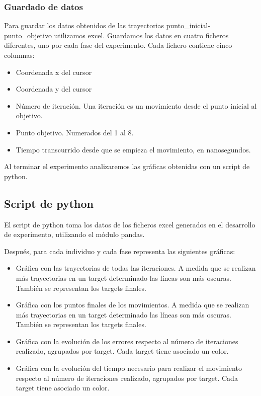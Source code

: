\documentclass[a4paper,11pt, oneside]{book}
\begin{document}
\subsubsection{Guardado de datos}

Para guardar los datos obtenidos de las trayectorias punto\_inicial-punto\_objetivo utilizamos excel. Guardamos los datos en cuatro ficheros diferentes, uno por cada fase del experimento. Cada fichero contiene cinco columnas:
\begin{itemize}
	\item Coordenada x del cursor
	\item Coordenada y del cursor
	\item Número de iteración. Una iteración es un movimiento desde el punto inicial al objetivo.
	\item Punto objetivo. Numerados del 1 al 8.
	\item Tiempo transcurrido desde que se empieza el movimiento, en nanosegundos.
\end{itemize}

Al terminar el experimento analizaremos las gráficas obtenidas con un script de python.

\subsection{Script de python}

El script de python toma los datos de los ficheros excel generados en el desarrollo de experimento, utilizando el módulo pandas.

Después, para cada individuo y cada fase representa las siguientes gráficas:

\begin{itemize}
	\item Gráfica con las trayectorias de todas las iteraciones. A medida que se realizan más trayectorias en un target determinado las líneas son más oscuras. También se representan los targets finales.
	\item Gráfica con los puntos finales de los movimientos. A medida que se realizan más trayectorias en un target determinado las líneas son más oscuras. También se representan los targets finales.
	\item Gráfica con la evolución de los errores respecto al número de iteraciones realizado, agrupados por target. Cada target tiene asociado un color.
	\item Gráfica con la evolución del tiempo necesario para realizar el movimiento respecto al número de iteraciones realizado, agrupados por target. Cada target tiene asociado un color.
\end{itemize}
\end{document}
